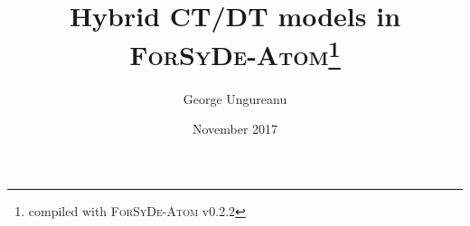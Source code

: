 \documentclass{article}
\title{Hybrid CT/DT models in\\\textsc{ForSyDe-Atom}\thanks{compiled with \textsc{ForSyDe-Atom} v0.2.2}}
\author{George Ungureanu}
\date{November 2017}
\begin{document}
\maketitle

\begin{abstract}

\end{abstract}



\newpage
\tableofcontents
\newpage







\printbibliography
\end{document}
